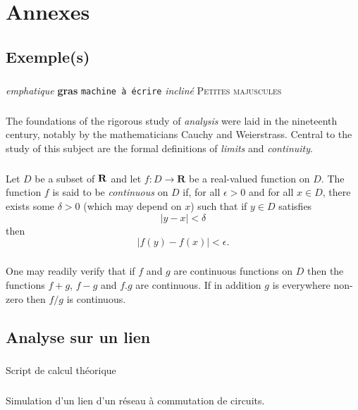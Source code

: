 %
\appendix{}
%
\chapter{Annexes}
%
    \section{Exemple(s)}
%
        \paragraph{}
\emph{emphatique}
\textbf{gras}
\texttt{machine à écrire}
\textsl{incliné}
\textsc{Petites majuscules}
%
        \paragraph{}
The foundations of the rigorous study of \emph{analysis}
were laid in the nineteenth century, notably by the
mathematicians Cauchy and Weierstrass. Central to the
study of this subject are the formal definitions of
\emph{limits} and \emph{continuity}.
%
        \paragraph{}
Let $D$ be a subset of $\bf R$ and let
$f \colon D \to \mathbf{R}$ be a real-valued function on
$D$. The function $f$ is said to be \emph{continuous} on
$D$ if, for all $\epsilon > 0$ and for all $x \in D$,
there exists some $\delta > 0$ (which may depend on $x$)
such that if $y \in D$ satisfies
\[ |y - x| < \delta \]
then
\[ |f(y) - f(x)| < \epsilon. \]
%
        \paragraph{}
One may readily verify that if $f$ and $g$ are continuous
functions on $D$ then the functions $f+g$, $f-g$ and
$f.g$ are continuous. If in addition $g$ is everywhere
non-zero then $f/g$ is continuous.
%
    \clearpage
%
%
%
    \section{Analyse sur un lien}
%
        \paragraph{}
Script de calcul théorique

    \clearpage
%
        \paragraph{}
Simulation d'un lien d'un réseau à commutation de circuits.

    \clearpage
%
%
%
